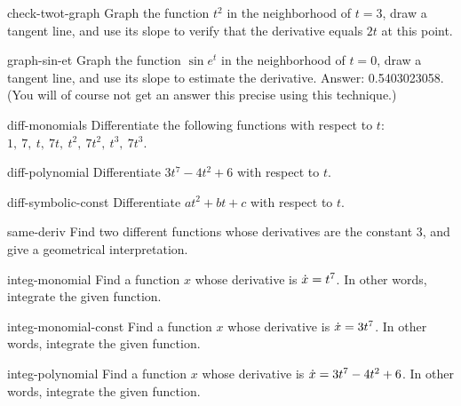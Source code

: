 \begin{hwsection}

\begin{hwwithsoln}{check-twot-graph}
Graph the function $t^2$ in the neighborhood of $t=3$, draw a tangent line, and use its slope
to verify that the derivative equals $2t$ at this point.
\end{hwwithsoln}

\begin{hwwithsoln}{graph-sin-et}
Graph the function $\sin e^t$ in the neighborhood of $t=0$, draw a tangent line, and use its slope
to estimate the derivative. Answer: 0.5403023058. (You will of course not get an answer this precise
using this technique.)
\end{hwwithsoln}

\begin{hwwithsoln}{diff-monomials}
Differentiate the following functions with respect to $t$: $1,\ 7,\ t,\ 7t,\ t^2,\ 7t^2,\ t^3,\ 7t^3$.
\end{hwwithsoln}

\begin{hwwithsoln}{diff-polynomial}
Differentiate $3t^7-4t^2+6$ with respect to $t$.
\end{hwwithsoln}

\begin{hwwithsoln}{diff-symbolic-const}
Differentiate $at^2+bt+c$ with respect to $t$.\thompson
\end{hwwithsoln}

\begin{hwwithsoln}{same-deriv}
Find two different functions whose derivatives are the constant 3, and give a geometrical
interpretation.
\end{hwwithsoln}

\begin{hwwithsoln}{integ-monomial}
Find a function $x$ whose derivative is $\dot{x}=t^7$. In other words, integrate the given function.
\end{hwwithsoln}

\begin{hwwithsoln}{integ-monomial-const}
Find a function $x$ whose derivative is $\dot{x}=3t^7$. In other words, integrate the given function.
\end{hwwithsoln}

\begin{hwwithsoln}{integ-polynomial}
Find a function $x$ whose derivative is $\dot{x}=3t^7-4t^2+6$. In other words, integrate the given function.
\end{hwwithsoln}


\end{hwsection}
